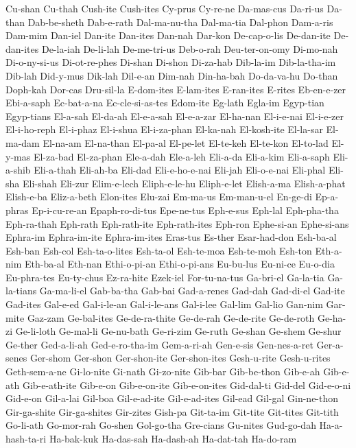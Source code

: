 {  Cu-shan Cu-thah Cush-ite Cush-ites Cy-prus Cy-re-ne
  Da-mas-cus Da-ri-us Da-than Dab-be-sheth Dab-e-rath Dal-ma-nu-tha
  Dal-ma-tia Dal-phon Dam-a-ris Dam-mim Dan-iel Dan-ite
  Dan-ites Dan-nah Dar-kon De-cap-o-lis De-dan-ite De-dan-ites
  De-la-iah De-li-lah De-me-tri-us Deb-o-rah Deu-ter-on-omy Di-mo-nah
  Di-o-ny-si-us Di-ot-re-phes Di-shan Di-shon Di-za-hab Dib-la-im
  Dib-la-tha-im Dib-lah Did-y-mus Dik-lah Dil-e-an Dim-nah
  Din-ha-bah Do-da-va-hu Do-than Doph-kah Dor-cas Dru-sil-la
  E-dom-ites E-lam-ites E-ran-ites E-rites Eb-en-e-zer Ebi-a-saph
  Ec-bat-a-na Ec-cle-si-as-tes Edom-ite Eg-lath Egla-im Egyp-tian
  Egyp-tians El-a-sah El-da-ah El-e-a-sah El-e-a-zar El-ha-nan
  El-i-e-nai El-i-e-zer El-i-ho-reph El-i-phaz El-i-shua El-i-za-phan
  El-ka-nah El-kosh-ite El-la-sar El-ma-dam El-na-am El-na-than
  El-pa-al El-pe-let El-te-keh El-te-kon El-to-lad El-y-mas
  El-za-bad El-za-phan Ele-a-dah Ele-a-leh Eli-a-da Eli-a-kim
  Eli-a-saph Eli-a-shib Eli-a-thah Eli-ah-ba Eli-dad Eli-e-ho-e-nai
  Eli-jah Eli-o-e-nai Eli-phal Eli-sha Eli-shah Eli-zur
  Elim-e-lech Eliph-e-le-hu Eliph-e-let Elish-a-ma Elish-a-phat Elish-e-ba
  Eliz-a-beth Elon-ites Elu-zai Em-ma-us Em-man-u-el En-ge-di
  Ep-a-phras Ep-i-cu-re-an Epaph-ro-di-tus Epe-ne-tus Eph-e-sus Eph-lal
  Eph-pha-tha Eph-ra-thah Eph-rath Eph-rath-ite Eph-rath-ites Eph-ron
  Ephe-si-an Ephe-si-ans Ephra-im Ephra-im-ite Ephra-im-ites Eras-tus
  Es-ther Esar-had-don Esh-ba-al Esh-ban Esh-col Esh-ta-o-lites
  Esh-ta-ol Esh-te-moa Esh-te-moh Esh-ton Eth-a-nim Eth-ba-al
  Eth-nan Ethi-o-pi-an Ethi-o-pi-ans Eu-bu-lus Eu-ni-ce Eu-o-dia
  Eu-phra-tes Eu-ty-chus Ez-ra-hite Ezek-iel For-tu-na-tus Ga-bri-el
  Ga-la-tia Ga-la-tians Ga-ma-li-el Gab-ba-tha Gab-bai Gad-a-renes
  Gad-dah Gad-di-el Gad-ite Gad-ites Gal-e-ed Gal-i-le-an
  Gal-i-le-ans Gal-i-lee Gal-lim Gal-lio Gan-nim Gar-mite
  Gaz-zam Ge-bal-ites Ge-de-ra-thite Ge-de-rah Ge-de-rite Ge-de-roth
  Ge-ha-zi Ge-li-loth Ge-mal-li Ge-nu-bath Ge-ri-zim Ge-ruth
  Ge-shan Ge-shem Ge-shur Ge-ther Ged-a-li-ah Ged-e-ro-tha-im
  Gem-a-ri-ah Gen-e-sis Gen-nes-a-ret Ger-a-senes Ger-shom Ger-shon
  Ger-shon-ite Ger-shon-ites Gesh-u-rite Gesh-u-rites Geth-sem-a-ne Gi-lo-nite
  Gi-nath Gi-zo-nite Gib-bar Gib-be-thon Gib-e-ah Gib-e-ath
  Gib-e-ath-ite Gib-e-on Gib-e-on-ite Gib-e-on-ites Gid-dal-ti Gid-del
  Gid-e-o-ni Gid-e-on Gil-a-lai Gil-boa Gil-e-ad-ite Gil-e-ad-ites
  Gil-ead Gil-gal Gin-ne-thon Gir-ga-shite Gir-ga-shites Gir-zites
  Gish-pa Git-ta-im Git-tite Git-tites Git-tith Go-li-ath
  Go-mor-rah Go-shen Gol-go-tha Gre-cians Gu-nites Gud-go-dah
  Ha-a-hash-ta-ri Ha-bak-kuk Ha-das-sah Ha-dash-ah Ha-dat-tah Ha-do-ram
}
